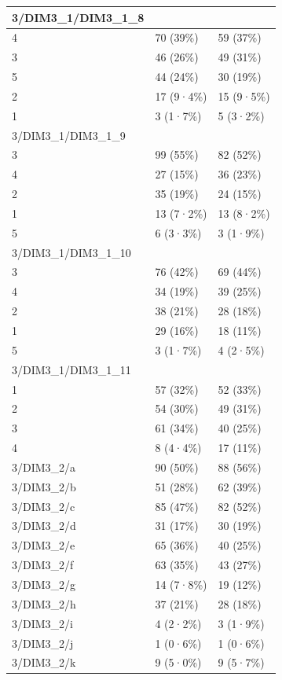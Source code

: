 \documentclass[
]{book}
\begin{document}
\begin{tabular}{l|l|l}
\hline
3/DIM3\_1/DIM3\_1\_8 &  & \\
\hline
4 & 70 (39\%) & 59 (37\%)\\
\hline
3 & 46 (26\%) & 49 (31\%)\\
\hline
5 & 44 (24\%) & 30 (19\%)\\
\hline
2 & 17 (9·4\%) & 15 (9·5\%)\\
\hline
1 & 3 (1·7\%) & 5 (3·2\%)\\
\hline
3/DIM3\_1/DIM3\_1\_9 &  & \\
\hline
3 & 99 (55\%) & 82 (52\%)\\
\hline
4 & 27 (15\%) & 36 (23\%)\\
\hline
2 & 35 (19\%) & 24 (15\%)\\
\hline
1 & 13 (7·2\%) & 13 (8·2\%)\\
\hline
5 & 6 (3·3\%) & 3 (1·9\%)\\
\hline
3/DIM3\_1/DIM3\_1\_10 &  & \\
\hline
3 & 76 (42\%) & 69 (44\%)\\
\hline
4 & 34 (19\%) & 39 (25\%)\\
\hline
2 & 38 (21\%) & 28 (18\%)\\
\hline
1 & 29 (16\%) & 18 (11\%)\\
\hline
5 & 3 (1·7\%) & 4 (2·5\%)\\
\hline
3/DIM3\_1/DIM3\_1\_11 &  & \\
\hline
1 & 57 (32\%) & 52 (33\%)\\
\hline
2 & 54 (30\%) & 49 (31\%)\\
\hline
3 & 61 (34\%) & 40 (25\%)\\
\hline
4 & 8 (4·4\%) & 17 (11\%)\\
\hline
3/DIM3\_2/a & 90 (50\%) & 88 (56\%)\\
\hline
3/DIM3\_2/b & 51 (28\%) & 62 (39\%)\\
\hline
3/DIM3\_2/c & 85 (47\%) & 82 (52\%)\\
\hline
3/DIM3\_2/d & 31 (17\%) & 30 (19\%)\\
\hline
3/DIM3\_2/e & 65 (36\%) & 40 (25\%)\\
\hline
3/DIM3\_2/f & 63 (35\%) & 43 (27\%)\\
\hline
3/DIM3\_2/g & 14 (7·8\%) & 19 (12\%)\\
\hline
3/DIM3\_2/h & 37 (21\%) & 28 (18\%)\\
\hline
3/DIM3\_2/i & 4 (2·2\%) & 3 (1·9\%)\\
\hline
3/DIM3\_2/j & 1 (0·6\%) & 1 (0·6\%)\\
\hline
3/DIM3\_2/k & 9 (5·0\%) & 9 (5·7\%)\\

\end{tabular}
\end{document}
